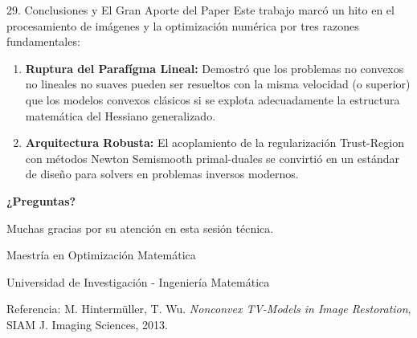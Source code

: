\documentclass[aspectratio=169,11pt]{beamer}
\begin{document}
\begin{frame}{29. Conclusiones y El Gran Aporte del Paper}
    Este trabajo marcó un hito en el procesamiento de imágenes y la optimización numérica por tres razones fundamentales:
    \begin{enumerate}
        \item \textbf{Ruptura del Parafígma Lineal:} Demostró que los problemas no convexos no lineales no suaves pueden ser resueltos con la misma velocidad (o superior) que los modelos convexos clásicos si se explota adecuadamente la estructura matemática del Hessiano generalizado.
        \item \textbf{Arquitectura Robusta:} El acoplamiento de la regularización Trust-Region con métodos Newton Semismooth primal-duales se convirtió en un estándar de diseño para solvers en problemas inversos modernos.
    \end{enumerate}
\end{frame}

\begin{frame}[plain]
    \centering
    \Huge \color{matheblue} \textbf{¿Preguntas?}
    \vspace{0.4cm} \par
    \Large \color{emeraldteal} Muchas gracias por su atención en esta sesión técnica. \par
    \vspace{1.2cm}
    \footnotesize Maestría en Optimización Matemática \par
    \scriptsize Universidad de Investigación - Ingeniería Matemática \par
    \tiny Referencia: M. Hintermüller, T. Wu. \textit{Nonconvex TV-Models in Image Restoration}, SIAM J. Imaging Sciences, 2013.
\end{frame}
\end{document}

